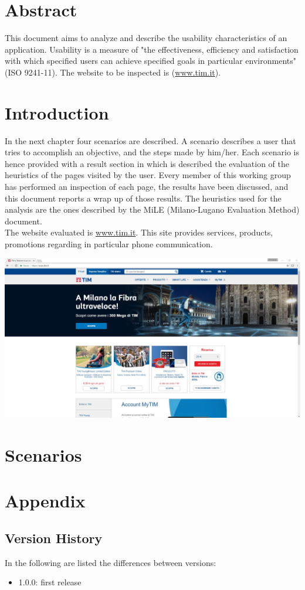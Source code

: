 \documentclass{../Common/Structure/doc_pdf}
\begin{document}
\titleToc

\chapter{Abstract}
\thispagestyle{fancy}
This document aims to analyze and describe the usability characteristics of an application. Usability is a measure of "the effectiveness, efficiency and satisfaction with which specified users can achieve specified goals in particular environments" (ISO 9241-11).
The website to be inspected is (\url{www.tim.it}).

\chapter{Introduction}
\thispagestyle{fancy}
In the next chapter four scenarios are described. A scenario describes a user that tries to accomplish an objective, and the steps made by him/her. Each scenario is hence provided with a result section in which is described the evaluation of the heuristics of the pages visited by the user. Every member of this working group has performed an inspection of each page, the results have been discussed, and this document reports a wrap up of those results. The heuristics used for the analysis are the ones described by the MiLE (Milano-Lugano Evaluation Method) document.\\
The website evaluated is \url{www.tim.it}. This site provides services, products, promotions regarding in particular phone communication.
\vspace{1cm}
\begin{center}
	\includegraphics[width=\textwidth]{Screenshot/homepage.jpg}
\end{center}


\chapter{Scenarios}
\thispagestyle{fancy}





\appendix
\chapter{Appendix}
\section{Version History}
In the following are listed the differences between versions:
\begin{itemize}
	\item 1.0.0: first release
\end{itemize}
\end{document}
